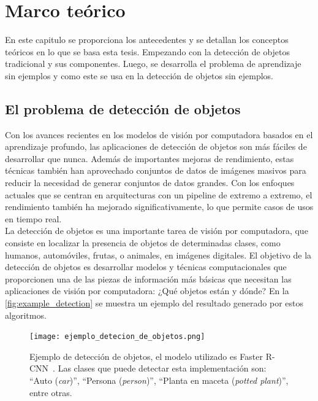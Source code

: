 \chapter{Marco teórico}\label{cap:marcoteorico}

En este capitulo se proporciona los antecedentes y se detallan los conceptos teóricos en lo que se basa esta tesis. Empezando con la detección de objetos tradicional y sus componentes. Luego, se desarrolla el problema de aprendizaje sin ejemplos y como este se usa en la detección de objetos sin ejemplos. 

\section{El problema de detección de objetos} \label{sec:elproblemadedetcciondeobjetos}
Con los avances recientes en los modelos de visión por computadora basados en el aprendizaje profundo, las aplicaciones de detección de objetos son más fáciles de desarrollar que nunca. Además de importantes mejoras de rendimiento, estas técnicas también han aprovechado conjuntos de datos de imágenes masivos para reducir la necesidad de generar conjuntos de datos grandes. Con los enfoques actuales que se centran en arquitecturas con un pipeline de extremo a extremo, el rendimiento también ha mejorado significativamente, lo que permite casos de usos en tiempo real.\\


La detección de objetos es una importante tarea de visión por computadora, que consiste en localizar la presencia de objetos de determinadas clases, como humanos, automóviles, frutas, o animales, en imágenes digitales. El objetivo de la detección de objetos es desarrollar modelos y técnicas computacionales que proporcionen una de las piezas de información más básicas que necesitan las aplicaciones de visión por computadora: ¿Qué objetos están y dónde? En la \autoref{fig:example_detection} se muestra un ejemplo del resultado generado por estos algoritmos.\\

\begin{figure}
	\centering
	\texttt{[image: ejemplo\_detecion\_de\_objetos.png]}
	\caption{Ejemplo de detección de objetos, el modelo utilizado es Faster R-CNN~\cite{ren2015faster}. Las clases que puede detectar esta implementación son: ``Auto (\textit{car})'',  ``Persona (\textit{person})'',  ``Planta en maceta (\textit{potted plant})'', entre otras.}
	\label{fig:example_detection}
\end{figure}

